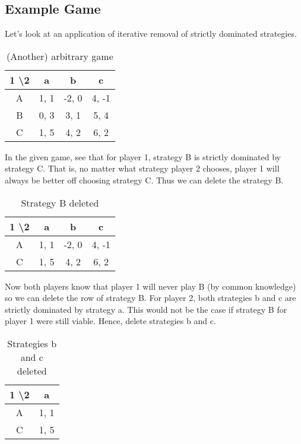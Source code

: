 \documentclass[11pt]{article}
\theoremstyle{definition}
\begin{document}
\subsection{Example Game}
Let's look at an application of iterative removal of strictly dominated strategies. 

\begin{table}[h!]
\centering
\begin{tabular}{|c|c|c|c|}
\hline
1 \textbackslash 2 & a & b & c \\
\hline
A & 1, 1 & -2, 0 & 4, -1\\
\hline
B & 0, 3 & 3, 1 & 5, 4 \\
\hline
C & 1, 5 & 4, 2 & 6, 2\\
\hline
\end{tabular}
\caption{(Another) arbitrary game}
\label{table:ag1}
\end{table}
\bigskip


In the given game, see that for player 1, strategy B is strictly dominated by strategy C. That is, no matter what strategy player 2 chooses, player 1 will always be better off choosing strategy C. Thus we can delete the strategy B.

\begin{table}[h!]
\centering
\begin{tabular}{|c|c|c|c|}
\hline
1 \textbackslash 2 & a & b & c \\
\hline
A & 1, 1 & -2, 0 & 4, -1\\
\hline
C & 1, 5 & 4, 2 & 6, 2\\
\hline
\end{tabular}
\caption{Strategy B deleted}
\label{table:ag2}
\end{table}

Now both players know that player 1 will never play B (by common knowledge) so we can delete the row of strategy B. For player 2, both strategies b and c are strictly dominated by strategy a. This would not be the case if strategy B for player 1 were still viable. Hence, delete strategies b and c.


\begin{table}[h!]
\centering
\begin{tabular}{|c|c|}
\hline
1 \textbackslash 2 & a\\
\hline
A & 1, 1\\
\hline
C & 1, 5\\
\hline
\end{tabular}
\caption{Strategies b and c deleted}
\label{table:ag3}
\end{table}
\end{document}
